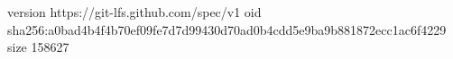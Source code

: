 version https://git-lfs.github.com/spec/v1
oid sha256:a0bad4b4f4b70ef09fe7d7d99430d70ad0b4cdd5e9ba9b881872ecc1ac6f4229
size 158627
